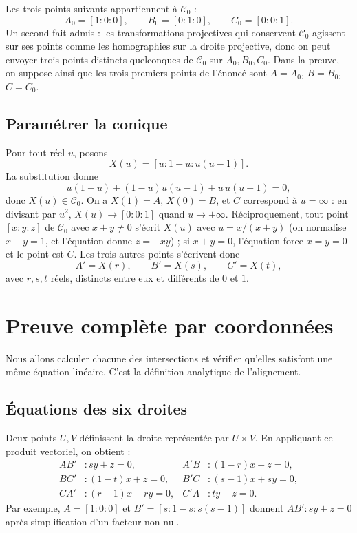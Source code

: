 Les trois points suivants appartiennent à $\mathcal C_0$ :
\[
 A_0=[1:0:0],\qquad B_0=[0:1:0],\qquad C_0=[0:0:1].
\]
Un second fait admis : les transformations projectives qui conservent $\mathcal C_0$ agissent sur ses points comme les homographies sur la droite projective, donc on peut envoyer trois points distincts quelconques de $\mathcal C_0$ sur $A_0,B_0,C_0$. Dans la preuve, on suppose ainsi que les trois premiers points de l'énoncé sont $A=A_0$, $B=B_0$, $C=C_0$.

\subsection{Paramétrer la conique}
Pour tout réel $u$, posons
\[
 X(u)=[u:1-u:u(u-1)].
\]
La substitution donne
\[
 u(1-u)+(1-u)u(u-1)+u\,u(u-1)=0,
\]
donc $X(u)\in\mathcal C_0$. On a $X(1)=A$, $X(0)=B$, et $C$ correspond à $u=\infty$ : en divisant par $u^2$, $X(u)\to[0:0:1]$ quand $u\to\pm\infty$. Réciproquement, tout point $[x:y:z]$ de $\mathcal C_0$ avec $x+y\ne0$ s'écrit $X(u)$ avec $u=x/(x+y)$ (on normalise $x+y=1$, et l'équation donne $z=-xy$) ; si $x+y=0$, l'équation force $x=y=0$ et le point est $C$. Les trois autres points s'écrivent donc
\[
 A'=X(r),\qquad B'=X(s),\qquad C'=X(t),
\]
avec $r,s,t$ réels, distincts entre eux et différents de $0$ et $1$.

\section{Preuve complète par coordonnées}
Nous allons calculer chacune des intersections et vérifier qu'elles satisfont une même équation linéaire. C'est la définition analytique de l'alignement.

\subsection{Équations des six droites}
Deux points $U,V$ définissent la droite représentée par $U\times V$. En appliquant ce produit vectoriel, on obtient :
\begin{align*}
 AB' &: sy+z=0, & A'B &: (1-r)x+z=0,\\
 BC' &: (1-t)x+z=0, & B'C &: (s-1)x+sy=0,\\
 CA' &: (r-1)x+ry=0, & C'A &: ty+z=0.
\end{align*}
Par exemple, $A=[1:0:0]$ et $B'=[s:1-s:s(s-1)]$ donnent $AB': sy+z=0$ après simplification d'un facteur non nul.

